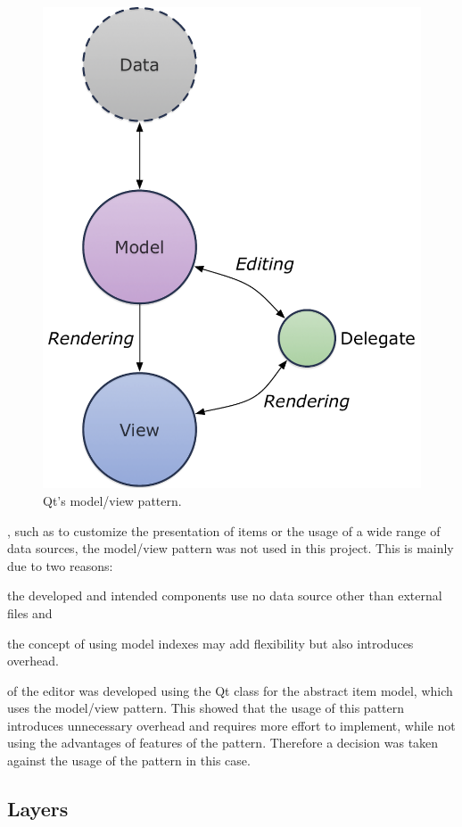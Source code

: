 \documentclass[%
    a4paper,    %
    justified,  %
    nobib,      %
    openany     %
]{tufte-book}
\makeatletter
\renewcommand{\label}[1]{\@tufte@label{##1}}%
\makeatother
\begin{document}
\begin{figure}[ht]
  \includegraphics[width=0.6\linewidth]{images/model-view-pattern}
  \caption{Qt's model/view pattern.~\cite{qt-mvp-2017}}
\label{fig:software-design-pattern-qt-mvp}
\end{figure}

, such as to customize the presentation
of items or the usage of a wide range of data sources, the model/view pattern was
not used in this project. This is mainly due to two reasons:
\begin{enumerate*}
  \item the developed and intended components use no data source other than external
    files and
  \item the concept of using model indexes may add flexibility but also
    introduces overhead.
\end{enumerate*}

 of the editor was developed using the Qt
class for the abstract item model, which uses the model/view pattern. This
showed that the usage of this pattern introduces unnecessary overhead and
requires more effort to implement, while not using the advantages of features of
the pattern. Therefore a decision was taken against the usage of the pattern in
this case.

\subsection{Layers}
\label{results:subsec:layers}
\end{document}
